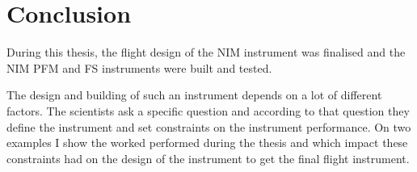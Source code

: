 \section{Conclusion}

	During this thesis, the flight design of the NIM instrument was finalised and the NIM PFM and FS instruments were built and tested.
	
	The design and building of such an instrument depends on a lot of different factors. The scientists ask a specific question and according to that question they define the instrument and set constraints on the instrument performance.
	On two examples I show the worked performed during the thesis and which impact these constraints had on the design of the instrument to get the final flight instrument.\\
	
